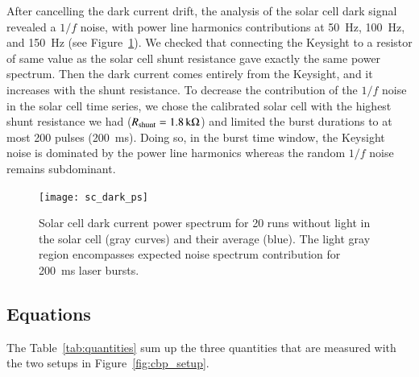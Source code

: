 
After cancelling the dark current drift, the analysis of the solar cell dark signal revealed a $1/f$ noise, with power line harmonics contributions at \SI{50}{\hertz},  \SI{100}{\hertz}, and \SI{150}{\hertz} (see Figure~\ref{fig:darkcurrentspectrum}). 
We checked that connecting the Keysight to a resistor of same value as the solar cell shunt resistance gave exactly the same
power spectrum. Then the dark current comes entirely from the Keysight, and it increases with the shunt resistance. To decrease the contribution of the $1/f$ noise in the solar cell time series, we chose the calibrated solar cell with the highest shunt resistance we had ($R_{\rm shunt} = \SI{1.8}{\kilo\ohm}$) and limited the burst durations to at most 200 pulses (\SI{200}{\ms}). Doing so, in the burst time window, the Keysight noise is dominated by the power line harmonics whereas the random $1/f$ noise remains subdominant.




\begin{figure}[h]
\begin{center}
\texttt{[image: sc\_dark\_ps]}
\end{center}
\caption[]{Solar cell dark current power spectrum for 20 runs without light in the solar cell (gray curves) and their average (blue). The light gray region encompasses expected noise spectrum contribution for \SI{200}{\ms} laser bursts.}
\label{fig:darkcurrentspectrum}
\end{figure}

\FloatBarrier   

\subsection{Equations}


The Table~\ref{tab:quantities} sum up the three quantities that are measured with the two setups in Figure~\ref{fig:cbp_setup}.

